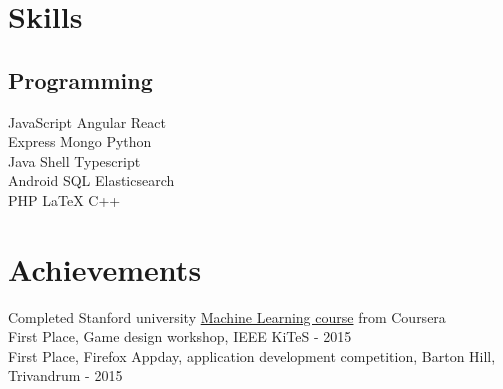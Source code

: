 \documentclass[]{font}
\begin{document}
%
%
\lastupdated

%
%

%
%

\begin{minipage}[t]{0.33\textwidth} 


\section{Skills}
\subsection{Programming}
JavaScript \textbullet{} Angular \textbullet{} React \\
Express \textbullet{}  Mongo \textbullet{} Python \\
Java \textbullet{} Shell \textbullet{} Typescript \\ 
Android \textbullet{} SQL \textbullet{} Elasticsearch \\
PHP \textbullet{} \LaTeX \textbullet{} C++\\
\sectionsep



\section{Achievements} 
\vspace{\topsep}
\textbullet{} Completed Stanford university \href{https://www.coursera.org/account/accomplishments/records/EJQWCKEBUSBD}{Machine Learning course} from Coursera \\
\textbullet{} First Place, Game design workshop, IEEE KiTeS - 2015 \\
\textbullet{} First Place, Firefox Appday, application development competition, Barton Hill, Trivandrum - 2015 \\
\sectionsep


\end{minipage}
\end{document}
